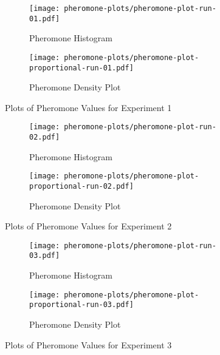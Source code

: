 \noindent{}
\begin{figure}[H]
    \centering
    \begin{subfigure}[b]{0.49\textwidth}
        \texttt{[image: pheromone-plots/pheromone-plot-run-01.pdf]}
        \caption{Pheromone Histogram}
    \end{subfigure}
    \begin{subfigure}[b]{0.49\textwidth}
        \texttt{[image: pheromone-plots/pheromone-plot-proportional-run-01.pdf]}
        \caption{Pheromone Density Plot}
    \end{subfigure}
    \caption{\label{fig:pheromone-run-1} Plots of Pheromone Values for Experiment 1}
\end{figure}
\begin{figure}[H]
    \centering

    \begin{subfigure}[b]{0.49\textwidth}
        \texttt{[image: pheromone-plots/pheromone-plot-run-02.pdf]}
        \caption{Pheromone Histogram}
    \end{subfigure}
    \begin{subfigure}[b]{0.49\textwidth}
        \texttt{[image: pheromone-plots/pheromone-plot-proportional-run-02.pdf]}
        \caption{Pheromone Density Plot}
    \end{subfigure}
    \caption{\label{fig:pheromone-run-2} Plots of Pheromone Values for Experiment 2}
\end{figure}
\begin{figure}[H]
    \centering

    \begin{subfigure}[b]{0.49\textwidth}
        \texttt{[image: pheromone-plots/pheromone-plot-run-03.pdf]}
        \caption{Pheromone Histogram}
    \end{subfigure}
    \begin{subfigure}[b]{0.49\textwidth}
        \texttt{[image: pheromone-plots/pheromone-plot-proportional-run-03.pdf]}
        \caption{Pheromone Density Plot}
    \end{subfigure}
    \caption{\label{fig:pheromone-run-3} Plots of Pheromone Values for Experiment 3}
\end{figure}
